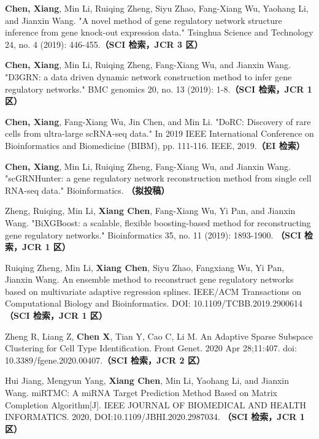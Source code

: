\else
\begin{enumerate}[label={[\arabic*]},itemindent=2em,wide]


\item \textbf{Chen, Xiang}, Min Li, Ruiqing Zheng, Siyu Zhao, Fang-Xiang Wu, Yaohang Li, and Jianxin Wang. "A novel method of gene regulatory network structure inference from gene knock-out expression data." Tsinghua Science and Technology 24, no. 4 (2019): 446-455.{\bfseries \heiti（SCI 检索，JCR 3 区）} 
\item \textbf{Chen, Xiang}, Min Li, Ruiqing Zheng, Fang-Xiang Wu, and Jianxin Wang. "D3GRN: a data driven dynamic network construction method to infer gene regulatory networks." BMC genomics 20, no. 13 (2019): 1-8.{\bfseries \heiti（SCI 检索，JCR 1 区）} 
\item \textbf{Chen, Xiang}, Fang-Xiang Wu, Jin Chen, and Min Li. "DoRC: Discovery of rare cells from ultra-large scRNA-seq data." In 2019 IEEE International Conference on Bioinformatics and Biomedicine (BIBM), pp. 111-116. IEEE, 2019.{\bfseries \heiti（EI 检索）}
\item \textbf{Chen, Xiang}, Min Li, Ruiqing Zheng, Fang-Xiang Wu, and Jianxin Wang. "scGRNHunter: a gene regulatory network reconstruction method from single cell RNA-seq data." Bioinformatics. {\bfseries \heiti（拟投稿）}
\item Zheng, Ruiqing, Min Li, \textbf{Xiang Chen}, Fang-Xiang Wu, Yi Pan, and Jianxin Wang. "BiXGBoost: a scalable, flexible boosting-based method for reconstructing gene regulatory networks." Bioinformatics 35, no. 11 (2019): 1893-1900. {\bfseries \heiti（SCI 检索，JCR 1 区）}
\item Ruiqing Zheng, Min Li, \textbf{Xiang Chen}, Siyu Zhao, Fangxiang Wu, Yi Pan, Jianxin Wang. An ensemble method to reconstruct gene regulatory networks based on multivariate adaptive regression splines. IEEE/ACM Transactions on Computational Biology and Bioinformatics. DOI: 10.1109/TCBB.2019.2900614  {\bfseries \heiti（SCI 检索，JCR 1 区）}
\item Zheng R, Liang Z, \textbf{Chen X}, Tian Y, Cao C, Li M. An Adaptive Sparse Subspace Clustering for Cell Type Identification. Front Genet. 2020 Apr 28;11:407. doi: 10.3389/fgene.2020.00407.{\bfseries \heiti（SCI 检索，JCR 2 区）}
\item Hui Jiang, Mengyun Yang, \textbf{Xiang Chen}, Min Li, Yaohang Li, and Jianxin Wang. miRTMC: A miRNA Target Prediction Method Based on Matrix Completion Algorithm[J]. IEEE JOURNAL OF BIOMEDICAL AND HEALTH INFORMATICS. 2020, DOI:10.1109/JBHI.2020.2987034. {\bfseries \heiti（SCI 检索，JCR 1 区）}

\end{enumerate}
\fi

